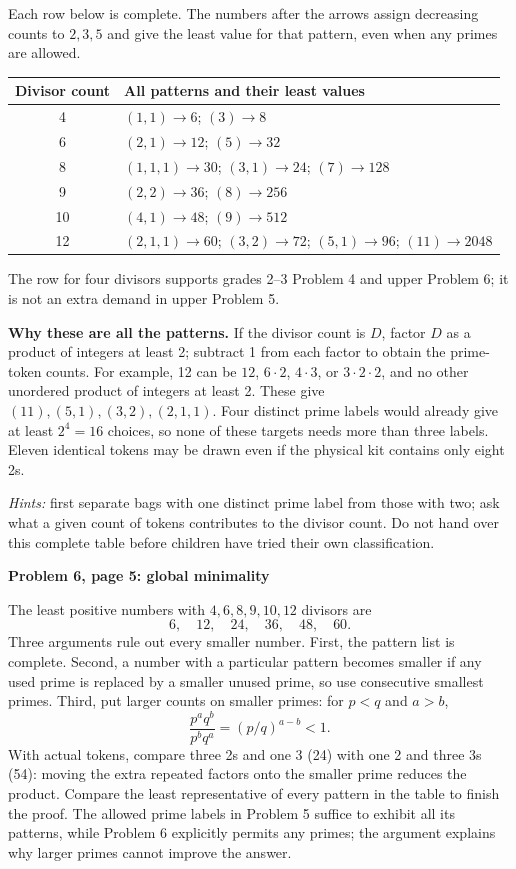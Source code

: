 \documentclass[11pt]{article}
\newcommand{\sub}[1]{\par\textbf{#1}\par}
\begin{document}
Each row below is complete. The numbers after the arrows assign decreasing counts to $2,3,5$ and give the least value for that pattern, even when any primes are allowed.
\begin{center}\small
\begin{tabular}{c p{11.8cm}}
\toprule Divisor count & All patterns and their least values\\\midrule
4 & $(1,1)\to 6$; $(3)\to 8$\\
6 & $(2,1)\to12$; $(5)\to32$\\
8 & $(1,1,1)\to30$; $(3,1)\to24$; $(7)\to128$\\
9 & $(2,2)\to36$; $(8)\to256$\\
10 & $(4,1)\to48$; $(9)\to512$\\
12 & $(2,1,1)\to60$; $(3,2)\to72$; $(5,1)\to96$; $(11)\to2048$\\\bottomrule
\end{tabular}\end{center}
The row for four divisors supports grades 2--3 Problem 4 and upper Problem 6; it is not an extra demand in upper Problem 5.

\textbf{Why these are all the patterns.} If the divisor count is $D$, factor $D$ as a product of integers at least 2; subtract 1 from each factor to obtain the prime-token counts. For example, 12 can be $12$, $6\cdot2$, $4\cdot3$, or $3\cdot2\cdot2$, and no other unordered product of integers at least 2. These give $(11),(5,1),(3,2),(2,1,1)$. Four distinct prime labels would already give at least $2^4=16$ choices, so none of these targets needs more than three labels. Eleven identical tokens may be drawn even if the physical kit contains only eight 2s.

\emph{Hints:} first separate bags with one distinct prime label from those with two; ask what a given count of tokens contributes to the divisor count. Do not hand over this complete table before children have tried their own classification.

\sub{Problem 6, page 5: global minimality}
The least positive numbers with $4,6,8,9,10,12$ divisors are
\[
\boxed{6,\quad12,\quad24,\quad36,\quad48,\quad60.}
\]
Three arguments rule out every smaller number. First, the pattern list is complete. Second, a number with a particular pattern becomes smaller if any used prime is replaced by a smaller unused prime, so use consecutive smallest primes. Third, put larger counts on smaller primes: for $p<q$ and $a>b$,
\[
\frac{p^a q^b}{p^b q^a}=(p/q)^{a-b}<1.
\]
With actual tokens, compare three 2s and one 3 (24) with one 2 and three 3s (54): moving the extra repeated factors onto the smaller prime reduces the product. Compare the least representative of every pattern in the table to finish the proof. The allowed prime labels in Problem 5 suffice to exhibit all its patterns, while Problem 6 explicitly permits any primes; the argument explains why larger primes cannot improve the answer.
\end{document}
